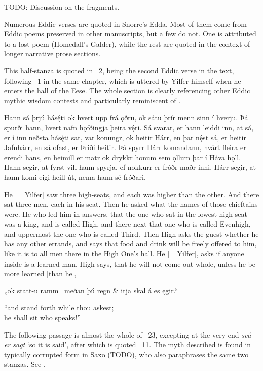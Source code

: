 
TODO: Discussion on the fragments.

Numerous Eddic verses are quoted in Snorre’s Edda. Most of them come from Eddic poems preserved in other manuscripts, but a few do not. One is attributed to a lost poem (Homedall’s Galder), while the rest are quoted in the context of longer narrative prose sections.

\sectionline

This half-stanza is quoted in \Gylfaginning\ 2, being the second Eddic verse in the text, following \Havamal\ 1 in the same chapter, which is uttered by Yilfer himself when he enters the hall of the Eese. The whole section is clearly referencing other Eddic mythic wisdom contests and particularly reminiscent of \Vafthrudnismal.

\bpg\bpa Hann sá þrjú hásę́ti ok hvert upp frá ǫðru, ok sátu þrír menn sinn í hverju. Þá spurði hann, hvert nafn hǫfðingja þeira vę́ri. Sá svarar, er hann leiddi inn, at sá, er í inu neðsta hásę́ti sat, var konungr, ok heitir Hárr, en þar nę́st sá, er heitir Jafnhárr, en sá ofast, er Þriði heitir. Þá spyrr Hárr komandann, hvárt fleira er erendi hans, en heimill er matr ok drykkr honum sem ǫllum þar í Háva hǫll. Hann segir, at fyrst vill hann spyrja, ef nokkurr er fróðr maðr inni. Hárr segir, at hann komi eigi heill út, nema hann sé fróðari,\epa

\bpb He [= Yilfer] saw three high-seats, and each was higher than the other. And there sat three men, each in his seat. Then he asked what the names of those chieftains were. He who led him in answers, that the one who sat in the lowest high-seat was a king, and is called High, and there next that one who is called Evenhigh, and uppermost the one who is called Third. Then High asks the guest whether he has any other errands, and says that food and drink will be freely offered to him, like it is to all men there in the High One’s hall. He [= Yilfer], asks if anyone inside is a learned man. High says, that he will not come out whole, unless he be more learned [than he],\epb\epg

\bvg
\bva „ok statt-u ramm \hld\ meðan þú regn &
\ind {}itja skal á es ęgir.“\eva

\bvb “and stand forth while thou askest; \\
he shall sit who speaks!”\evb
\evg

\sectionline

The following passage is almost the whole of \Gylfaginning\ 23, excepting at the very end \emph{svá er sagt} ‘so it is said’, after which is quoted \Grimnismal\ 11.
The myth described is found in typically corrupted form in Saxo (TODO), who also paraphrases the same two stanzas. See \textcite{Hopkins2021}.

